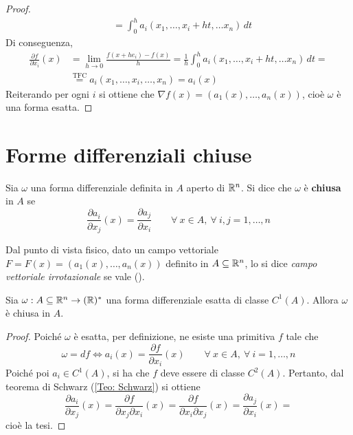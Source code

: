 \begin{proof}
\begin{equation}
\begin{aligned}
    &=\int_{0}^{h}{a_i(x_1, \dots, x_i+ht, \dots x_n)}\, dt
\end{aligned}
\end{equation}
Di conseguenza, 
\begin{equation}
\begin{aligned}
    \frac{\partial{f}}{\partial x_i}{(x)}&= \lim_{h\to 0}{\frac{f(x+he_i)-f(x)}{h}}= \frac{1}{h}{\int_{0}^{h}{a_i(x_1, \dots, x_i+ht, \dots x_n)}\, dt}=\\
    &\overset{\text{TFC}}{=} a_i(x_1, \dots, x_i, \dots, x_n) = a_i (x)
\end{aligned}
\end{equation}
Reiterando per ogni $i$ si ottiene che $\nabla f(x)= (a_1(x), \dots, a_n(x))$, cioè $\omega$ è una forma esatta. 
\end{proof}
\section{Forme differenziali chiuse}
\begin{definition} \label{Def: Forma differenziale chiusa}
    Sia $\omega$ una forma differenziale definita in $A$ aperto di $\mathbb{R}^n$. Si dice che $\omega$ è \textbf{chiusa} in $A$ se
    \begin{equation}
        \frac{\partial a_i}{\partial x_j}(x)= \frac{\partial a_j}{\partial x_i} \qquad \forall\ x \in A,\ \forall\ i, j = 1, \dots, n
    \end{equation}
\end{definition}
Dal punto di vista fisico, dato un campo vettoriale $F=F(x)=(a_1(x), \dots, a_n(x))$ definito in $A \subseteq \mathbb{R}^n$, lo si dice \textit{campo vettoriale irrotazionale} se vale (\theequation). 
\begin{theorem} \label{Teo: Forma esatta => forma chiusa}
    Sia $\omega: A \subseteq \mathbb{R}^n \to (\mathbb{R})^*$ una forma differenziale esatta di classe $C^1(A)$. Allora $\omega$ è chiusa in $A$.
\end{theorem}
\begin{proof}
    Poiché $\omega$ è esatta, per definizione, ne esiste una primitiva $f$ tale che
    \begin{equation}
        \omega= df \iff a_i(x)=\frac{\partial f }{\partial x_i}(x) \qquad \forall\ x \in A,\ \forall\ i=1, \dots, n
    \end{equation}
    Poiché poi $a_i \in C^1(A)$, si ha che $f$ deve essere di classe $C^2(A)$. Pertanto, dal teorema di Schwarz (\ref{Teo: Schwarz}) si ottiene
    \begin{equation}
        \frac{\partial a_i}{\partial x_j}(x)= \frac{\partial f}{\partial x_j \partial x_i}(x) = \frac{\partial f}{\partial x_i \partial x_j}(x) = \frac{\partial a_j}{\partial x_i}(x)= 
    \end{equation}
    cioè la tesi.
\end{proof}
